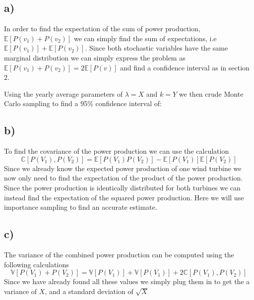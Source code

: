 \documentclass[a4paper]{article}
\begin{document}
\subsection*{a)}
In order to find the expectation of the sum of power production, $\mathbb{E}[P(v_1) + P(v_2)]$ we can simply find the sum of expectations, i.e $\mathbb{E}[P(v_1)] + \mathbb{E}[P(v_2)]$. Since both stochastic variables have the same marginal distribution we can simply express the problem as $\mathbb{E}[P(v_1) + P(v_2)] = 2\mathbb{E}[P(v)]$ and find a confidence interval as in section 2.

Using the yearly average parameters of $\lambda = X$ and $k = Y$ we then crude Monte Carlo sampling to find a 95\% confidence interval of:

\subsection*{b)}
To find the covariance of the power production we can use the calculation
\begin{equation}
     \mathbb{C}[P(V_1), P(V_2)] = \mathbb{E}[P(V_1)P(V_2)] - \mathbb{E}[P(V_1)]\mathbb{E}[P(V_2)]
\end{equation}
Since we already know the expected power production of one wind turbine we now only need to find the expectation of the product of the power production. Since the power production is identically distributed for both turbines we can instead find the expectation of the squared power production. Here we will use importance sampling to find an accurate estimate.

\subsection*{c)}
The variance of the combined power production can be computed using the following calculations
\begin{equation}
    \mathbb{V}[P(V_1) + P(V_2)] = \mathbb{V}[P(V_1)] + \mathbb{V}[P(V_1)] + 2\mathbb{C}[P(V_1), P(V_2)]
\end{equation}
Since we have already found all these values we simply plug them in to get the a variance of $X$, and a standard deviation of $\sqrt{X}$
\end{document}
